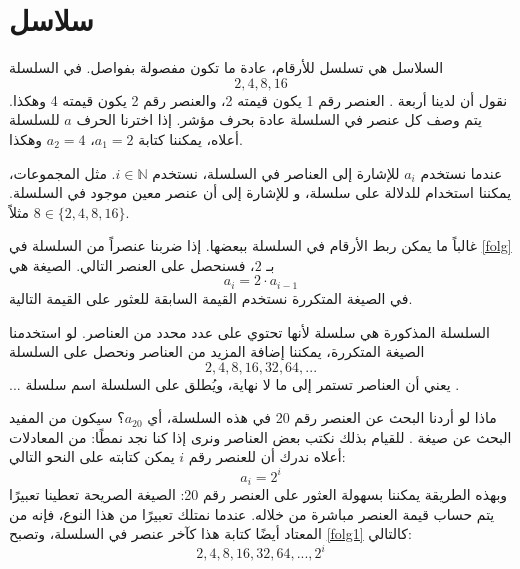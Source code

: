 




\setcounter{chapter}{1}
\section{سلاسل}
السلاسل هي تسلسل للأرقام، عادة ما تكون مفصولة بفواصل. في السلسلة
\begin{equation}
	2, 4, 8, 16  \label{folg}
\end{equation}
نقول أن لدينا أربعة . العنصر رقم 1 يكون قيمته 2، والعنصر رقم 2 يكون قيمته 4 وهكذا. يتم وصف كل عنصر في السلسلة عادة بحرف مؤشر. إذا اخترنا الحرف \( a \) للسلسلة أعلاه، يمكننا كتابة \( a_1 = 2 \)، \( a_2 = 4 \) وهكذا.\vsk

عندما نستخدم \( a_i \) للإشارة إلى العناصر في السلسلة، نستخدم \( {i\in \mathbb{N}} \). مثل المجموعات، يمكننا استخدام \sym{$ \lbrace\rbrace $} للدلالة على سلسلة، و \sym{$ \in $} للإشارة إلى أن عنصر معين موجود في السلسلة. مثلاً \( 8\in\lbrace2, 4, 8, 16\rbrace \).\vsk

غالباً ما يمكن ربط الأرقام في السلسلة ببعضها. إذا ضربنا عنصراً من السلسلة في \eqref{folg} بـ \( 2 \)، فسنحصل على العنصر التالي. الصيغة  هي
\[ a_i = 2\cdot a_{i-1} \]
في الصيغة المتكررة نستخدم القيمة السابقة للعثور على القيمة التالية.\vsk

السلسلة المذكورة هي سلسلة  لأنها تحتوي على عدد محدد من العناصر. لو استخدمنا الصيغة المتكررة، يمكننا إضافة المزيد من العناصر ونحصل على السلسلة
\begin{equation}
	2, 4, 8, 16, 32, 64, ...  \label{folg1}
\end{equation}
\( ... \) يعني أن العناصر تستمر إلى ما لا نهاية، ويُطلق على السلسلة اسم سلسلة .\vsk

ماذا لو أردنا البحث عن العنصر رقم 20 في هذه السلسلة، أي \( a_{20} \)؟ سيكون من المفيد البحث عن صيغة . للقيام بذلك نكتب بعض العناصر ونرى إذا كنا نجد نمطًا:
من المعادلات أعلاه ندرك أن للعنصر رقم \( i \) يمكن كتابته على النحو التالي:
\[ a_i=2^i \]
وبهذه الطريقة يمكننا بسهولة العثور على العنصر رقم 20:
الصيغة الصريحة تعطينا تعبيرًا يتم حساب قيمة العنصر مباشرة من خلاله. عندما نمتلك تعبيرًا من هذا النوع، فإنه من المعتاد أيضًا كتابة هذا كآخر عنصر في السلسلة، وتصبح \eqref{folg1} كالتالي:
\[  2, 4, 8, 16, 32, 64, ..., 2^i \]
